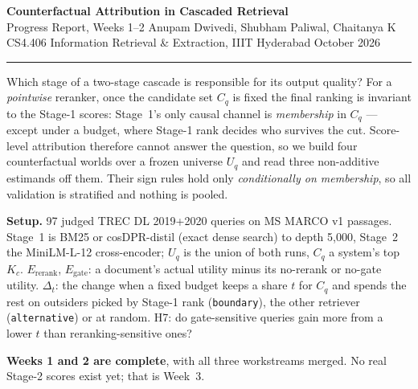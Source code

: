 \documentclass[10pt,a4paper]{article}
\newcommand{\Uq}{U_q}
\newcommand{\Kc}{K_c}
\begin{document}
\begin{center}
{\large\bfseries Counterfactual Attribution in Cascaded Retrieval}\\[1pt]
{\small Progress Report, Weeks 1--2 \;\textbullet\; Anupam Dwivedi, Shubham
Paliwal, Chaitanya K\\
CS4.406 Information Retrieval \& Extraction, IIIT Hyderabad \;\textbullet{} October 2026}
\end{center}
\vspace{-4pt}
\hrule
\vspace{4pt}

Which stage of a two-stage cascade is responsible for its output quality? For a
\emph{pointwise} reranker, once the candidate set $C_q$ is fixed the final
ranking is invariant to the Stage-1 scores: Stage~1's only causal channel is
\emph{membership} in $C_q$ --- except under a budget, where Stage-1 rank decides
who survives the cut. Score-level attribution therefore cannot answer the
question, so we build four counterfactual worlds over a frozen universe $\Uq$
and read three non-additive estimands off them. Their sign rules hold only \emph{conditionally on membership}, so all
validation is stratified and nothing is pooled.

\textbf{Setup.} 97 judged TREC DL 2019+2020 queries on MS MARCO v1 passages.
Stage~1 is BM25 or cosDPR-distil (exact dense search) to depth 5{,}000, Stage~2
the MiniLM-L-12 cross-encoder; $\Uq$ is the union of both runs, $C_q$ a
system's top $\Kc$. $E_{\text{rerank}}$, $E_{\text{gate}}$: a document's
actual utility minus its no-rerank or no-gate utility. $\Delta_t$: the change
when a fixed budget keeps a share $t$ for $C_q$ and spends the rest on outsiders
picked by Stage-1 rank (\texttt{boundary}), the other retriever
(\texttt{alternative}) or at random. H7: do gate-sensitive queries gain more
from a lower $t$ than reranking-sensitive ones?

\textbf{Weeks 1 and 2 are complete}, with all three workstreams merged. No real
Stage-2 scores exist yet; that is Week~3.
\end{document}
